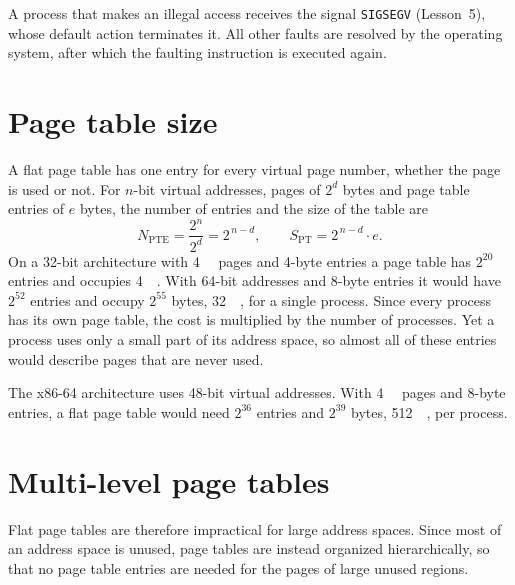 \documentclass[../main.tex]{subfiles}
\begin{document}
A process that makes an illegal access receives the signal
\texttt{SIGSEGV} (Lesson~5), whose default action terminates it.  All other
faults are resolved by the operating system, after which the faulting
instruction is executed again.

\section{Page table size}
\label{sec:l08-pt-size}

A flat page table has one entry for every virtual page number, whether the
page is used or not.  For
$n$-bit virtual addresses, pages of $2^{d}$ bytes and page table entries of
$e$ bytes, the number of entries and the size of the table are
\begin{equation}
  N_{\mathrm{PTE}} = \frac{2^{n}}{2^{d}} = 2^{\,n-d} ,
  \qquad
  S_{\mathrm{PT}} = 2^{\,n-d} \cdot e .
  \label{eq:l08-pt-size}
\end{equation}
On a 32-bit architecture with \SI{4}{\kibi\byte} pages and 4-byte entries a
page table has $2^{20}$ entries and occupies \SI{4}{\mebi\byte}.  With
64-bit addresses and 8-byte entries it would have $2^{52}$ entries and
occupy $2^{55}$ bytes, \SI{32}{\pebi\byte}, for a single process.  Since
every process has its own page table, the cost is multiplied by the number
of processes.  Yet a process uses only a small part of its address space,
so almost all of these entries would describe pages that are never
used.

\begin{example}
  The x86-64 architecture uses 48-bit virtual addresses.  With
  \SI{4}{\kibi\byte} pages and 8-byte entries, a flat page table would need
  $2^{36}$ entries and $2^{39}$ bytes, \SI{512}{\gibi\byte}, per process.
\end{example}

\section{Multi-level page tables}
\label{sec:l08-multilevel}

Flat page tables are therefore impractical for large address
spaces.  Since most of an address space is unused, page tables are
instead organized hierarchically, so that no page table entries are needed
for the pages of large unused regions.
\end{document}

